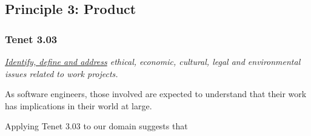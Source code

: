 

\subsection{Principle 3: Product}

\subsubsection{Tenet 3.03}
\emph{\ul{Identify, define and address} ethical, economic, cultural, legal and environmental issues related to work projects. \cite{se_code}}

\tenetmargin

As software engineers, those involved are expected to understand that their work has implications in their world at large.


Applying Tenet 3.03 to our domain suggests that 
